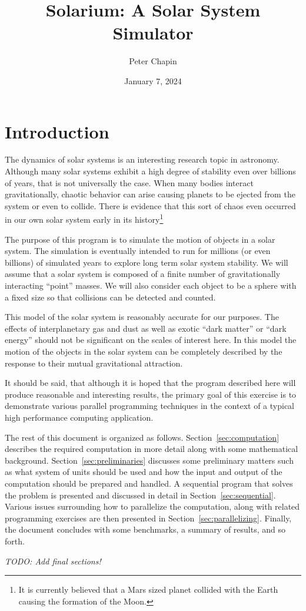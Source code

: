 \documentclass{article}
\begin{document}
\title{Solarium: A Solar System Simulator}
\author{Peter Chapin}
\date{January 7, 2024}
\maketitle

\section{Introduction}
\label{sec:introduction}

The dynamics of solar systems is an interesting research topic in astronomy. Although many solar
systems exhibit a high degree of stability even over billions of years, that is not universally
the case. When many bodies interact gravitationally, chaotic behavior can arise causing planets
to be ejected from the system or even to collide. There is evidence that this sort of chaos even
occurred in our own solar system early in its history\footnote{It is currently believed that a
Mars sized planet collided with the Earth causing the formation of the Moon.}

The purpose of this program is to simulate the motion of objects in a solar system. The
simulation is eventually intended to run for millions (or even billions) of simulated years to
explore long term solar system stability. We will assume that a solar system is composed of a
finite number of gravitationally interacting ``point'' masses. We will also consider each object
to be a sphere with a fixed size so that collisions can be detected and counted.

This model of the solar system is reasonably accurate for our purposes. The effects of
interplanetary gas and dust as well as exotic ``dark matter'' or ``dark energy'' should not be
significant on the scales of interest here. In this model the motion of the objects in the solar
system can be completely described by the response to their mutual gravitational attraction.

It should be said, that although it is hoped that the program described here will produce
reasonable and interesting results, the primary goal of this exercise is to demonstrate various
parallel programming techniques in the context of a typical high performance computing
application.

The rest of this document is organized as follows. Section~\ref{sec:computation} describes the
required computation in more detail along with some mathematical background.
Section~\ref{sec:preliminaries} discusses some preliminary matters such as what system of units
should be used and how the input and output of the computation should be prepared and handled. A
sequential program that solves the problem is presented and discussed in detail in
Section~\ref{sec:sequential}. Various issues surrounding how to parallelize the computation,
along with related programming exercises are then presented in Section~\ref{sec:parallelizing}.
Finally, the document concludes with some benchmarks, a summary of results, and so forth.






\textit{TODO: Add final sections!}
\end{document}
